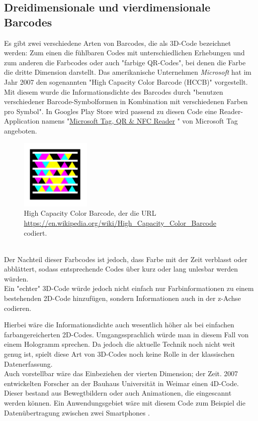 \subsection{Dreidimensionale und vierdimensionale Barcodes}
Es gibt zwei verschiedene Arten von Barcodes, die als 3D-Code bezeichnet werden:
Zum einen die fühlbaren Codes mit unterschiedlichen Erhebungen und zum anderen die Farbcodes oder auch "farbige QR-Codes", bei denen die Farbe die dritte Dimension darstellt.
Das amerikanische Unternehmen \textit{Microsoft} hat im Jahr 2007 den sogenannten "High Capacity Color Barcode (HCCB)" vorgestellt. Mit diesem wurde die Informationsdichte des Barcodes durch "benutzen verschiedener Barcode-Symbolformen in Kombination mit verschiedenen Farben pro Symbol"\cite{Paradiso2007}.
In Googles Play Store wird passend zu diesen Code eine Reader-Application namens "\href{https://play.google.com/store/apps/details?id=com.microsoft.tag.app.reader}{Microsoft Tag, QR \& NFC Reader} " von Microsoft Tag angeboten.
\begin{figure}[htbp]%
	\centering
	\includegraphics[width=0.3\textwidth]{Bilder/HCCB.png} 
	\vspace{-0.2cm}
	\caption[High Capacity Color Barcode]{High Capacity Color Barcode, der die URL \url{https://en.wikipedia.org/wiki/High_Capacity_Color_Barcode} codiert.\footnotemark}
	\label{fig:hccb}	
\end{figure}
~\\
Der Nachteil dieser Farbcodes ist jedoch, dass Farbe mit der Zeit verblasst oder abblättert, sodass entsprechende Codes über kurz oder lang unlesbar werden würden.\\
Ein "{}echter"{} 3D-Code würde jedoch nicht einfach nur Farbinformationen zu einem bestehenden 2D-Code hinzufügen, sondern Informationen auch in der z-Achse codieren. 

Hierbei wäre die Informationsdichte auch wesentlich höher als bei einfachen farbangereicherten 2D-Codes.  Umgangssprachlich würde man in diesem Fall von einem Hologramm sprechen. Da jedoch die aktuelle Technik noch nicht weit genug ist, spielt diese Art von 3D-Codes noch keine Rolle in der klassischen Datenerfassung. \cite{EtiscanGmbH2016}\\
Auch vorstellbar wäre das Einbeziehen der vierten Dimension; der Zeit. 2007 entwickelten Forscher an der Bauhaus Universität in Weimar einen 4D-Code. Dieser bestand aus Bewegtbildern oder auch Animationen, die eingescannt werden können. Ein Anwendungsgebiet wäre mit diesem Code zum Beispiel die Datenübertragung zwischen zwei Smartphones \cite{Unglaube2015}.

~\pagebreak
